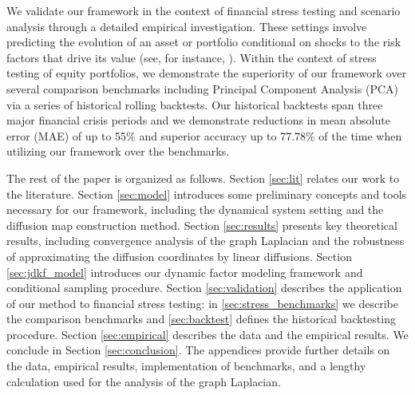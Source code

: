 \documentclass[11pt]{article}
\theoremstyle{plain}
\theoremstyle{definition}
\theoremstyle{remark}
\numberwithin{equation}{section}
\begin{document}
We validate our framework in the context of financial stress testing and scenario analysis through a detailed empirical investigation. These settings involve predicting the evolution of an asset or portfolio conditional on shocks to the risk factors that drive its value (see, for instance, \citet{haugh2020scenario}).
Within the context of stress testing of equity portfolios, 
we demonstrate the superiority of our framework over several comparison benchmarks including Principal Component Analysis (PCA) via a series of historical rolling backtests. Our historical backtests span three major financial crisis periods and we demonstrate reductions in mean absolute error (MAE) of up to 55\% and superior accuracy up to 77.78\% of the time when utilizing our framework over the benchmarks. 

The rest of the paper is organized as follows. Section \ref{sec:lit} relates our work to the literature. Section \ref{sec:model} introduces some preliminary concepts and tools necessary for our framework, including the dynamical system setting and the diffusion map construction method. Section \ref{sec:results} presents key theoretical results, including convergence analysis of the graph Laplacian and the robustness of approximating the diffusion coordinates by linear diffusions. Section \ref{sec:jdkf_model} introduces our dynamic factor modeling framework and conditional sampling procedure. Section \ref{sec:validation} describes the application of our method to financial stress testing: in \ref{sec:stress_benchmarks} we describe the comparison benchmarks and \ref{sec:backtest} defines the historical backtesting procedure. Section \ref{sec:empirical} describes the data and the empirical results. We conclude in Section \ref{sec:conclusion}. The appendices provide further details on the data, empirical results, implementation of benchmarks, and a lengthy calculation used for the analysis of the graph Laplacian.
\end{document}
